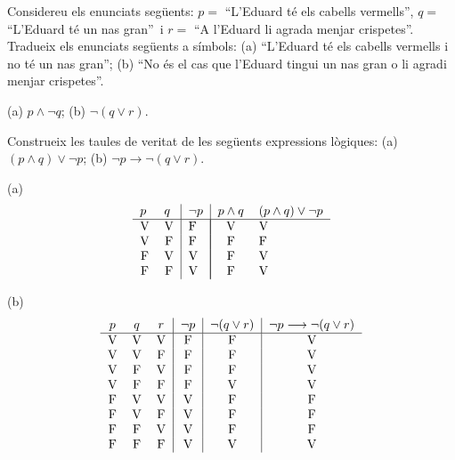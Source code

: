 \begin{exercici}
Considereu els enunciats següents: $p=$ \enquote{L'Eduard té
els cabells vermells}, $q=$ \enquote{L'Eduard té
un nas gran}\ i $r=$ \enquote{A l'Eduard li agrada
menjar crispetes}. Tradueix els enunciats següents a
símbols: (a) \enquote{L'Eduard té els cabells vermells i no
té un nas gran}; (b) \enquote{No és el cas
que l'Eduard tingui un nas gran o li agradi menjar crispetes}.
\end{exercici}

\begin{solucio}
(a) $p\wedge\lnot q$; (b) $\lnot(q\vee r)$.
\end{solucio}

\begin{exercici}
Construeix les taules de veritat de les següents expressions lògiques:
(a) $(p\wedge q)\vee\lnot p$; (b) $\lnot p\longrightarrow\lnot(q\vee r)$.
\end{exercici}

\begin{solucio}
(a)%
\[%
\begin{tabular}
[c]{ll|l|ll}%
$p$ & $q$ & $\lnot p$ & $p\wedge q$ & $(p\wedge q)\vee\lnot p$\\\hline
\multicolumn{1}{c}{V} & \multicolumn{1}{c|}{V} & F & \multicolumn{1}{|c}{V} &
V\\
\multicolumn{1}{c}{V} & \multicolumn{1}{c|}{F} & F & \multicolumn{1}{|c}{F} &
F\\
\multicolumn{1}{c}{F} & \multicolumn{1}{c|}{V} & V & \multicolumn{1}{|c}{F} &
V\\
\multicolumn{1}{c}{F} & \multicolumn{1}{c|}{F} & V & \multicolumn{1}{|c}{F} &
V
\end{tabular}
\]


(b)%
\[%
\begin{tabular}{ccc|c|c|c}
$p$ & $q$ & $r$ & $\lnot p$ & $\lnot(q\vee r)$ & $\lnot p\longrightarrow\lnot(q\vee r)$\\\hline
V & V & V & F & F & V\\
V & V & F & F & F & V\\
V & F & V & F & F & V\\
V & F & F & F & V & V\\
F & V & V & V & F & F\\
F & V & F & V & F & F\\
F & F & V & V & F & F\\
F & F & F & V & V & V
\end{tabular}
\]

\end{solucio}

